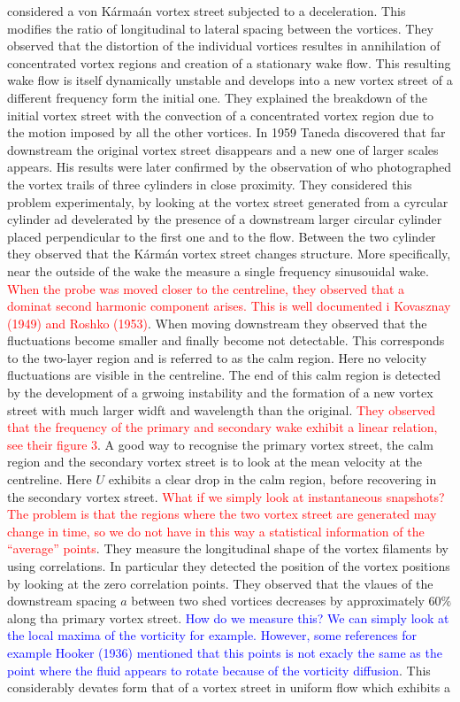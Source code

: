 \cite{durgin-karlsson-1971} considered a von K\'{a}rma\'{a}n vortex street subjected to a deceleration. This modifies the ratio of longitudinal to lateral spacing between the vortices. They observed that the distortion of the individual vortices resultes in annihilation of concentrated vortex regions and creation of a stationary wake flow. This resulting wake flow is itself dynamically unstable and develops into a new vortex street of a different frequency form the initial one. They explained the breakdown of the initial vortex street with the convection of a concentrated vortex region due to the motion imposed by all the other vortices. In 1959 Taneda discovered that far downstream the original vortex street disappears and a new one of larger scales appears. His results were later confirmed by the observation of \cite{zdravkovich-1968} who photographed the vortex trails of three cylinders in close proximity. They considered this problem experimentaly, by looking at the vortex street generated from a cyrcular cylinder ad develerated by the presence of a downstream larger circular cylinder placed perpendicular to the first one and to the flow. Between the two cylinder they observed that the K\'{a}rm\'{a}n vortex street changes structure. More specifically, near the outside of the wake the measure a single frequency sinusouidal wake. \textcolor{red}{When the probe was moved closer to the centreline, they observed that a dominat second harmonic component arises. This is well documented i Kovasznay (1949) and Roshko (1953)}. When moving downstream they observed that the fluctuations become smaller and finally become not detectable. This corresponds to the two-layer region and is referred to as the calm region. Here no velocity fluctuations are visible in the centreline. The end of this calm region is detected by the development of a grwoing instability and the formation of a new vortex street with much larger widft and wavelength than the original. \textcolor{red}{They observed that the frequency of the primary and secondary wake exhibit a linear relation, see their figure 3}. A good way to recognise the primary vortex street, the calm region and the secondary vortex street is to look at the mean velocity at the centreline. Here $U$ exhibits a clear drop in the calm region, before recovering in the secondary vortex street. \textcolor{red}{What if we simply look at instantaneous snapshots? The problem is that the regions where the two vortex street are generated may change in time, so we do not have in this way a statistical information of the ``average'' points}. They measure the longitudinal shape of the vortex filaments by using correlations. In particular they detected the position of the vortex positions by looking at the zero correlation points. They observed that the vlaues of the downstream spacing $a$ between two shed vortices decreases by approximately $60\%$ along tha primary vortex street. \textcolor{blue}{How do we measure this? We can simply look at the local maxima of the vorticity for example. However, some references for example Hooker (1936) mentioned that this points is not exacly the same as the point where the fluid appears to rotate because of the vorticity diffusion}. This considerably devates form that of a vortex street in uniform flow which exhibits a 